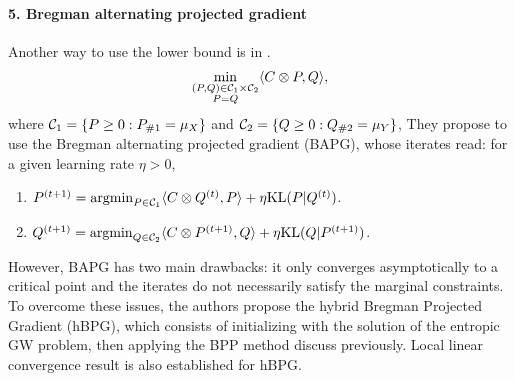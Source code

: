 \paragraph{5. Bregman alternating projected gradient}
Another way to use the lower bound is in \citep{Li22}.
\begin{align}
  \min_{\substack{(P, Q) \in \mathcal C_1 \times \mathcal C_2 \\ P = Q}} \langle C \otimes P, Q \rangle,
\end{align}
where $\mathcal C_1 = \{ P \geq 0: P_{\# 1} = \mu_X \}$ and $\mathcal C_2 = \{ Q \geq 0: Q_{\# 2} = \mu_Y \}$,
They propose to use the Bregman alternating projected gradient (BAPG), whose iterates read:
for a given learning rate $\eta > 0$,
\begin{enumerate}
  \item $P^{(t+1)} = \operatorname*{argmin}_{P \in \mathcal C_1} \langle C \otimes Q^{(t)}, P \rangle + \eta \text{KL}(P | Q^{(t)})$.
  \item $Q^{(t+1)} = \operatorname*{argmin}_{Q \in \mathcal C_2} \langle C \otimes P^{(t+1)}, Q \rangle + \eta \text{KL}(Q | P^{(t+1)})$.
\end{enumerate}
However, BAPG has two main drawbacks: it only converges asymptotically to a critical point and
the iterates do not necessarily satisfy the marginal constraints. To overcome these issues,
the authors propose the hybrid Bregman Projected Gradient (hBPG),
which consists of initializing with the solution of the entropic GW problem,
then applying the BPP method discuss previously. Local linear convergence result
is also established for hBPG.

